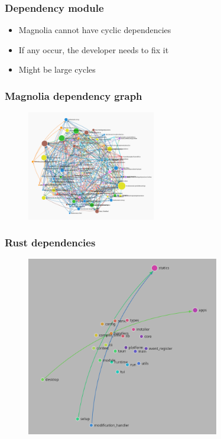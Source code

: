 \begin{frame}
  \frametitle{Dependency module}
  \begin{itemize}
    \item Magnolia cannot have cyclic dependencies
    \pause
    \item If any occur, the developer needs to fix it
    \pause
    \item Might be large cycles
  \end{itemize}
\end{frame}

\begin{frame}
  \frametitle{Magnolia dependency graph}
  \begin{figure}
    \centering
    \includegraphics[width=0.5\textwidth]{./pics/magnolia-dependencies.png}
  \end{figure}
\end{frame}

\begin{frame}
  \frametitle{Rust dependencies}
  \begin{figure}
    \centering
    \includegraphics[width=0.75\textwidth]{./pics/rust-deps.png}
  \end{figure}
\end{frame}

